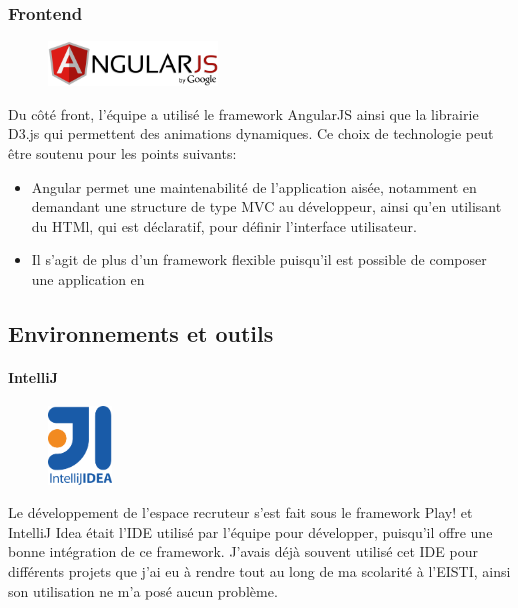 \subsubsection{Frontend}
\label{subs:Frontend}
\begin{figure}[h]
  \begin{center}
    \includegraphics[width=0.4\textwidth]{Pictures/angular_logo.png}
  \end{center}
\end{figure}
Du côté front, l'équipe a utilisé le framework AngularJS ainsi que la librairie D3.js qui permettent des animations dynamiques.
Ce choix de technologie peut être soutenu pour les points suivants:
\begin{itemize}
  \item Angular permet une maintenabilité de l'application aisée, notamment en demandant une structure de type MVC au développeur, ainsi qu'en utilisant du HTMl, qui est déclaratif, pour définir l'interface utilisateur.
  \item Il s'agit de plus d'un framework flexible puisqu'il est possible de composer une application en
\end{itemize}

\subsection{Environnements et outils}
\paragraph{IntelliJ}
\label{par:IntelliJ}
\begin{figure}
  \vspace{-2.5em}
  \begin{center}
    \includegraphics[width=0.15\textwidth]{Pictures/intellij_logo.png}
  \end{center}
\end{figure}
Le développement de l'espace recruteur s'est fait sous le framework Play! et IntelliJ Idea était l'IDE utilisé par l'équipe pour développer, puisqu'il offre une bonne intégration de ce framework.
J'avais déjà souvent utilisé cet IDE pour différents projets que j'ai eu à rendre tout au long de ma scolarité à l'EISTI, ainsi son utilisation ne m'a posé aucun problème.
